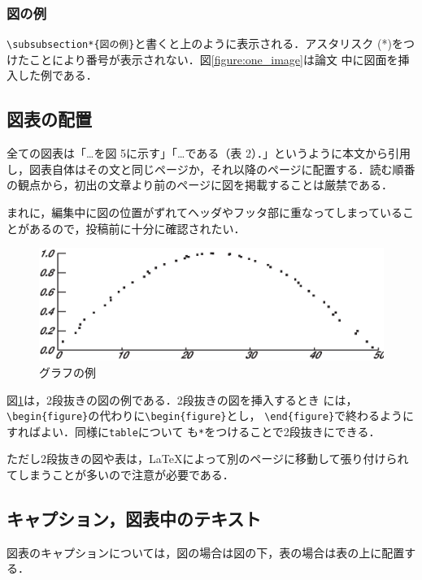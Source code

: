\subsubsection*{図の例}

\verb|\subsubsection*{図の例}|と書くと上のように表示される．アスタリスク
(*)をつけたことにより番号が表示されない．図\ref{figure:one_image}は論文
中に図面を挿入した例である．

\subsection*{図表の配置}
全ての図表は「…を図 5に示す」「…である（表 2）．」というように本文から引用し，図表自体はその文と同じページか，それ以降のページに配置する．読む順番の観点から，初出の文章より前のページに図を掲載することは厳禁である．

まれに，編集中に図の位置がずれてヘッダやフッタ部に重なってしまっていることがあるので，投稿前に十分に確認されたい．

\begin{figure}[ht]
\centering
\includegraphics[scale=0.6]{graph_.eps} 
\caption{グラフの例}
\label{figure:graph}
\end{figure} 

図\ref{figure:graph}は，2段抜きの図の例である．2段抜きの図を挿入するとき
には，\verb|\begin{figure}|の代わりに\verb|\begin{figure}|とし，
\verb|\end{figure}|で終わるようにすればよい．同様に\verb|table|について
も\verb|*|をつけることで2段抜きにできる．

ただし2段抜きの図や表は，\LaTeX によって別のページに移動して張り付けられ
てしまうことが多いので注意が必要である．

\subsection{キャプション，図表中のテキスト}
図表のキャプションについては，図の場合は図の下，表の場合は表の上に配置する．

